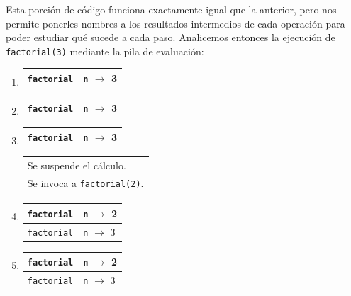 Esta porción de código funciona exactamente igual que la anterior, pero nos
permite ponerles nombres a los resultados intermedios de cada operación
para poder estudiar qué sucede a cada paso.
Analicemos entonces la ejecución de \lstinline|factorial(3)|  mediante la pila de
evaluación:

\begin{enumerate}

\item {}
	\begin{tabular}{r|l|}
	\hline
	\currentframe \verb|factorial| & \verb|n| $\rightarrow$ 3 \\
	\hline
	\end{tabular}

\item {}
	\begin{tabular}{r|l|}
	\hline
	\currentframe \verb|factorial| & \verb|n| $\rightarrow$ 3 \\
	\hline
	\end{tabular}

\item {}
	\begin{tabular}{r|l|}
	\hline
	\currentframe \verb|factorial| & \verb|n| $\rightarrow$ 3 \\
	\hline
	\end{tabular}
	\begin{tabular}{l}
	Se suspende el cálculo. \\
	Se invoca a \verb|factorial(2)|.
	\end{tabular}

\item {}
	\begin{tabular}{r|l|}
	\hline
	\currentframe \verb|factorial| & \verb|n| $\rightarrow$ 2 \\
	\hline
	\hline
	              \verb|factorial| & \verb|n| $\rightarrow$ 3 \\
	\hline
	\end{tabular}

\item {}
	\begin{tabular}{r|l|}
	\hline
	\currentframe \verb|factorial| & \verb|n| $\rightarrow$ 2 \\
	\hline
	\hline
	              \verb|factorial| & \verb|n| $\rightarrow$ 3 \\
	\hline
	\end{tabular}


\end{enumerate}
